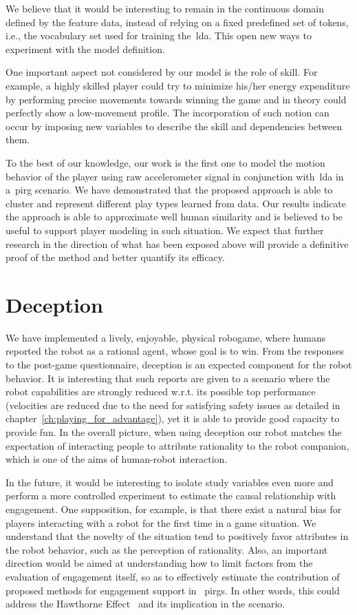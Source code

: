 We believe that it would be interesting to remain in the continuous domain defined by the feature data, instead of relying on a fixed predefined set of tokens, i.e., the vocabulary set used for training the~\gls{lda}. This open new ways to experiment with the model definition.

One important aspect not considered by our model is the role of skill. For example, a highly skilled player could try to minimize his/her energy expenditure by performing precise movements towards winning the game and in theory could perfectly show a low-movement profile.  The incorporation of such notion can occur by imposing new variables to describe the skill and dependencies between them. 

To the best of our knowledge, our work is the first one to model the motion behavior of the player using raw accelerometer signal in conjunction with~\gls{lda} in a~\gls{pirg} scenario. We have demonstrated that the proposed approach is able to cluster and represent different play types learned from data. Our results indicate the approach is able to approximate well human similarity and is believed to be useful to support player modeling in such situation. We expect that further research in the direction of what has been exposed above will provide a definitive proof of the method and better quantify its efficacy. 

\section{Deception}
We have implemented a lively, enjoyable, physical robogame, where humans reported the robot as a rational agent, whose goal is to win. From the responses to the post-game questionnaire, deception is an expected component for the robot behavior. It is interesting that such reports are given to a scenario where the robot capabilities are strongly reduced w.r.t. its possible top performance (\eg velocities are reduced due to the need for satisfying safety issues as detailed in chapter~\ref{ch:playing_for_advantage}), yet it is able to provide good capacity to provide fun. In the overall picture, when using deception our robot matches the expectation of interacting people to attribute rationality to the robot companion, which is one of the aims of human-robot interaction.

In the future, it would be interesting to isolate study variables even more and perform a more controlled experiment to estimate the causal relationship with engagement. One supposition, for example, is that there exist a natural bias for players interacting with a robot for the first time in a game situation. We understand that the novelty of the situation tend to positively favor attributes in the robot behavior, such as the perception of rationality. Also, an important direction would be aimed at understanding how to limit factors from the evaluation of engagement itself, so as to effectively estimate the contribution of proposed methods for engagement support in ~\gls{pirg}s. In other words, this could address the Hawthorne Effect~\citep{jones_was_1992} and its implication in the scenario.

